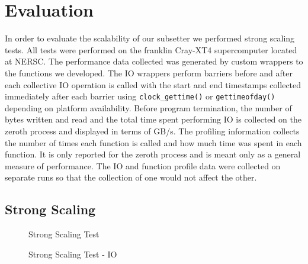 \section{Evaluation}
\label{section:evaluation}

In order to evaluate the scalability of our subsetter we performed strong
scaling tests.  All tests were performed on the franklin Cray-XT4
supercomputer\cite{franklin} located at NERSC\cite{NERSC}.  The performance
data collected was generated by custom wrappers to the functions we developed.
The IO wrappers perform barriers before and after each collective IO operation
is called with the start and end timestamps collected immediately after each
barrier using \verb=clock_gettime()= or \verb=gettimeofday()= depending on
platform availability.  Before program termination, the number of bytes
written and read and the total time spent performing IO is collected on the
zeroth process and displayed in terms of GB/s.  The profiling information
collects the number of times each function is called and how much time was
spent in each function.  It is only reported for the zeroth process and is
meant only as a general measure of performance.  The IO and function profile
data were collected on separate runs so that the collection of one would not
affect the other.

\subsection{Strong Scaling}

\begin{figure}[!t]
\center
\resizebox{3.5in}{!}{

}
\caption{Strong Scaling Test}
\label{fig:strong}
\end{figure}

\begin{figure}[!t]
\center
\resizebox{3.5in}{!}{

}
\caption{Strong Scaling Test - IO}
\label{fig:strong_io}
\end{figure}

